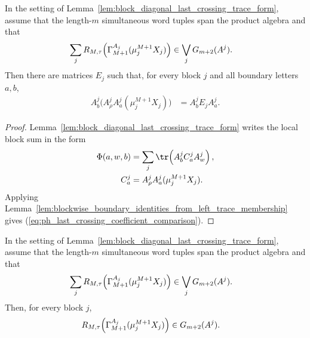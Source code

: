 \begin{lemma}
    \label{lem:block_diagonal_last_crossing_coefficients_from_sum_membership}
    \leanok
    In the setting of Lemma~\ref{lem:block_diagonal_last_crossing_trace_form},
    assume that the length-$m$ simultaneous word tuples span the product
    algebra and that
    \begin{align}
        \sum_j
        R_{M,\tau}\!\left(\Gamma_{M+1}^{A_j}(\mu_j^{M+1}X_j)\right)
         & \in \bigvee_j G_{m+2}(A^j).
        \notag
    \end{align}
    Then there are matrices $E_j$ such that, for every block $j$ and all
    boundary letters $a,b$,
    \begin{align}
        A^j_b\bigl(    A^j_\rho A^j_a(\mu_j^{M+1}X_j)
        \bigr)
         & =
        A^j_bE_jA^j_a.
        \label{eq:ph_last_crossing_coefficient_comparison}
    \end{align}
\end{lemma}

\begin{proof}
    \leanok
    Lemma~\ref{lem:block_diagonal_last_crossing_trace_form} writes the local
    block sum in the form
    \begin{align}
        \Phi(a,w,b)
         & =
        \sum_j\tr\!\left(A^j_bC^j_aA^j_w\right),
        \notag \\
        C^j_a
         & =
        A^j_\rho A^j_a(\mu_j^{M+1}X_j).
        \notag
    \end{align}
    Applying
    Lemma~\ref{lem:blockwise_boundary_identities_from_left_trace_membership}
    gives (\ref{eq:ph_last_crossing_coefficient_comparison}).
\end{proof}

\begin{lemma}
    \label{lem:block_diagonal_last_crossing_component_membership_from_sum_membership}
    \leanok
    In the setting of Lemma~\ref{lem:block_diagonal_last_crossing_trace_form},
    assume that the length-$m$ simultaneous word tuples span the product
    algebra and that
    \begin{align}
        \sum_j
        R_{M,\tau}\!\left(\Gamma_{M+1}^{A_j}(\mu_j^{M+1}X_j)\right)
         & \in \bigvee_j G_{m+2}(A^j).
        \notag
    \end{align}
    Then, for every block $j$,
    \begin{align}
        R_{M,\tau}\!\left(\Gamma_{M+1}^{A_j}(\mu_j^{M+1}X_j)\right)
         & \in G_{m+2}(A^j).
        \notag
    \end{align}
\end{lemma}

